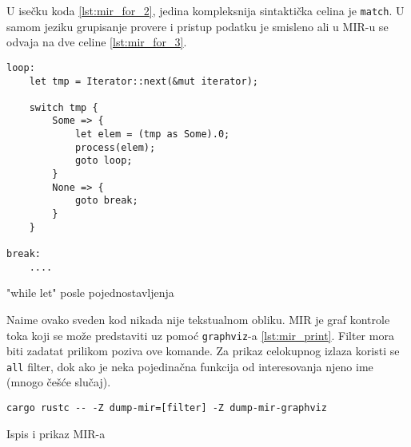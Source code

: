\newpage
U isečku koda \ref{lst:mir_for_2}, jedina kompleksnija sintaktička celina je \verb|match|. U samom jeziku 
grupisanje provere i pristup podatku je smisleno ali u MIR-u se odvaja na dve celine \ref{lst:mir_for_3}.

\begin{listing}[H]
\begin{verbatim}
loop:
    let tmp = Iterator::next(&mut iterator);
    
    switch tmp {
        Some => {
            let elem = (tmp as Some).0;
            process(elem);
            goto loop;
        }
        None => {
            goto break;
        }
    }
    
break:
    ....
\end{verbatim}
\caption{"while let" posle pojednostavljenja}
\label{lst:mir_for_3}
\end{listing}

Naime ovako sveden kod nikada nije tekstualnom obliku. MIR je graf kontrole toka koji se može predstaviti
uz pomoć \verb|graphviz|-a \ref{lst:mir_print}. Filter mora biti zadatat prilikom poziva ove komande. 
Za prikaz celokupnog izlaza koristi se \verb|all| filter, dok ako je neka pojedinačna funkcija od interesovanja
njeno ime (mnogo češće slučaj).

\begin{listing}[H]
\begin{verbatim}
cargo rustc -- -Z dump-mir=[filter] -Z dump-mir-graphviz
\end{verbatim}
\caption{Ispis i prikaz MIR-a}
\label{lst:mir_print}
\end{listing}

